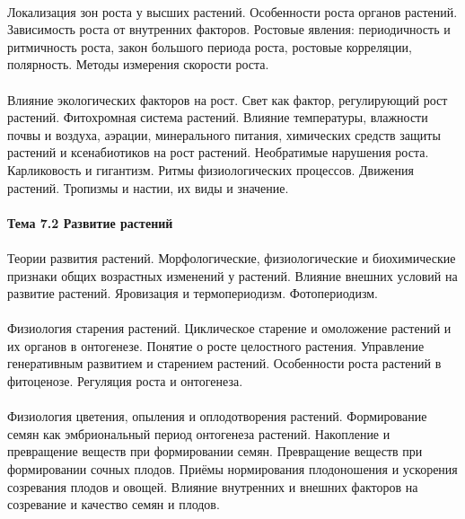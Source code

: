 \paragraph*{}Локализация зон роста у высших растений. Особенности роста органов растений. Зависимость роста от внутренних факторов. Ростовые явления: периодичность и ритмичность роста, закон большого периода роста, ростовые корреляции, полярность. Методы измерения скорости роста.

\paragraph*{}Влияние экологических факторов на рост. Свет как фактор, регулирующий рост растений. Фитохромная система растений. Влияние температуры, влажности почвы и воздуха, аэрации, минерального питания, химических средств защиты растений и ксенабиотиков на рост растений. Необратимые нарушения роста. Карликовость и гигантизм. Ритмы физиологических процессов. Движения растений. Тропизмы и настии, их виды и значение.

\paragraph*{Тема 7.2 Развитие растений}

\paragraph*{}Теории развития растений. Морфологические, физиологические и биохимические признаки общих возрастных изменений у растений. Влияние внешних условий на развитие растений. Яровизация и термопериодизм. Фотопериодизм.

\paragraph*{}Физиология старения растений. Циклическое старение и омоложение растений и их органов в онтогенезе. Понятие о росте целостного растения. Управление генеративным развитием и старением растений. Особенности роста растений в фитоценозе. Регуляция роста и онтогенеза.

\paragraph*{}Физиология цветения, опыления и оплодотворения растений. Формирование семян как эмбриональный период онтогенеза растений. Накопление и превращение веществ при формировании семян. Превращение веществ при формировании сочных плодов. Приёмы нормирования плодоношения и ускорения созревания плодов и овощей. Влияние внутренних и внешних факторов на созревание и качество семян и плодов.

